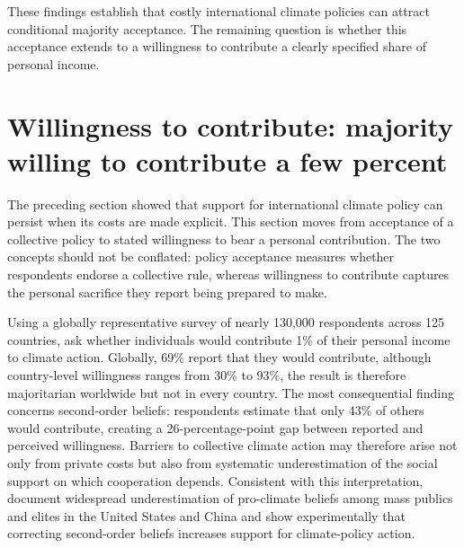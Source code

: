 \documentclass[11pt,a4paper]{article}
\begin{document}
These findings establish that costly international climate policies can attract conditional majority acceptance. The remaining question is whether this acceptance extends to a willingness to contribute a clearly specified share of personal income.


\section{Willingness to contribute: majority willing to contribute a few percent}

The preceding section showed that support for international climate policy can persist when its costs are made explicit. This section moves from acceptance of a collective policy to stated willingness to bear a personal contribution. The two concepts should not be conflated: policy acceptance measures whether respondents endorse a collective rule, whereas willingness to contribute captures the personal sacrifice they report being prepared to make. 

Using a globally representative survey of nearly 130,000 respondents across 125 countries, \citet{andre_globally_2024} ask whether individuals would contribute 1\% of their personal income to climate action. Globally, 69\% report that they would contribute, although country-level willingness ranges from 30\% to 93\%, the result is therefore majoritarian worldwide but not in every country. %
The most consequential finding concerns second-order beliefs: respondents estimate that only 43\% of others would contribute, creating a 26-percentage-point gap between reported and perceived willingness. Barriers to collective climate action may therefore arise not only from private costs but also from systematic underestimation of the social support on which cooperation depends. Consistent with this interpretation, \citet{mildenberger_beliefs_2017} document widespread underestimation of pro-climate beliefs among mass publics and elites in the United States and China and show experimentally that correcting second-order beliefs increases support for climate-policy action.
\end{document}
